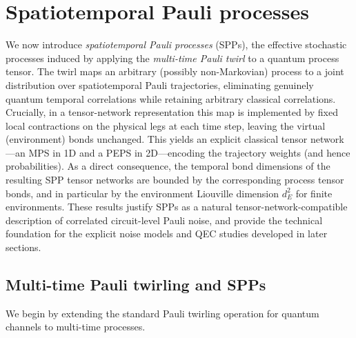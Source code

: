 \section{Spatiotemporal Pauli processes}\label{sec:spp}
We now introduce \emph{spatiotemporal Pauli processes} (SPPs), the effective stochastic processes induced by applying the \emph{multi-time Pauli twirl} to a quantum process tensor. The twirl maps an arbitrary (possibly non-Markovian) process to a joint distribution over spatiotemporal Pauli trajectories, eliminating genuinely quantum temporal correlations while retaining arbitrary classical correlations. Crucially, in a tensor-network representation this map is implemented by fixed local contractions on the physical legs at each time step, leaving the virtual (environment) bonds unchanged. This yields an explicit classical tensor network---an MPS in 1D and a PEPS in 2D---encoding the trajectory weights (and hence probabilities). As a direct consequence, the temporal bond dimensions of the resulting SPP tensor networks are bounded by the corresponding process tensor bonds, and in particular by the environment Liouville dimension \(d_E^2\) for finite environments. These results justify SPPs as a natural tensor-network-compatible description of correlated circuit-level Pauli noise, and provide the technical foundation for the explicit noise models and QEC studies developed in later sections.

\subsection{Multi-time Pauli twirling and SPPs}
We begin by extending the standard Pauli twirling operation for quantum channels to multi-time processes.

